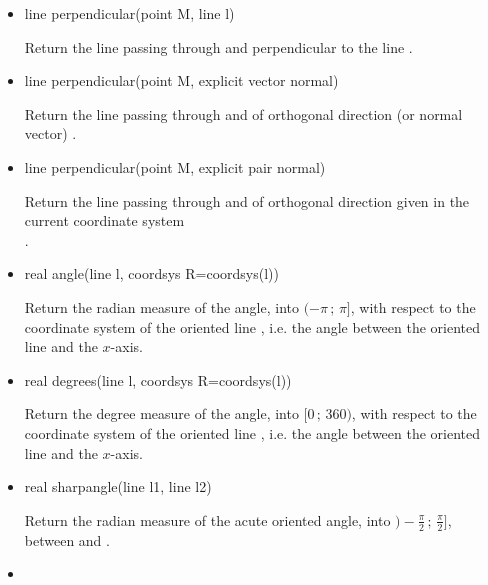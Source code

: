 \documentclass[pdftex]{article}
\begin{document}
\begin{itemize}
\item {}%
  \begin{Vcolor}
    line perpendicular(point M, line l)
  \end{Vcolor}
  Return the line passing through  and perpendicular to the
  line .
\item {}%
  \begin{Vcolor}
    line perpendicular(point M, explicit vector normal)
  \end{Vcolor}
  Return the line passing through  and of orthogonal
  direction (or normal vector) .
\item {}%
  \begin{Vcolor}
    line perpendicular(point M, explicit pair normal)
  \end{Vcolor}
  Return the line passing through  and of orthogonal
  direction  given in the current coordinate system\hfill\\
  .
\item {}%
  \begin{Vcolor}
    real angle(line l, coordsys R=coordsys(l))
  \end{Vcolor}
  Return the radian measure of the angle, into  $(-\pi\,;\,\pi]$, with
  respect to the coordinate system  of the oriented
  line , i.e. the angle between the oriented line and the $x$-axis.
\item {}%
  \begin{Vcolor}
    real degrees(line l, coordsys R=coordsys(l))
  \end{Vcolor}
  Return the degree measure of the angle, into $[0\,;\,360)$, with
  respect to the  coordinate system  of the oriented
  line , i.e.  the angle between the oriented line and the $x$-axis.
\item {}%
  \begin{Vcolor}
    real sharpangle(line l1, line l2)
  \end{Vcolor}
  Return the radian measure of the acute oriented angle, into
  $)-\frac{\pi}{2}\,;\,\frac{\pi}{2}]$, between  and .
\item {}%

\end{itemize}
\end{document}
